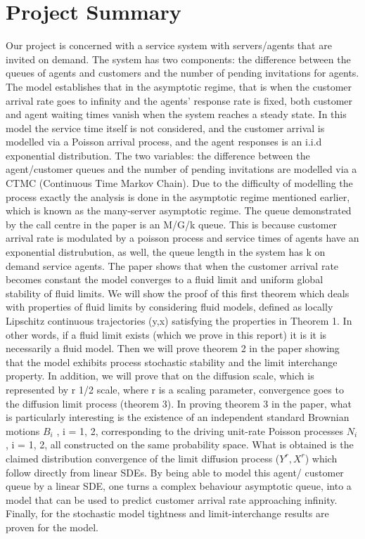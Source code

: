 	\section{Project Summary}
Our project is concerned with a service system with servers/agents that are invited on demand. The system has two components: the difference between the queues of agents and customers and the number of pending invitations for agents. The model establishes that in the asymptotic regime, that is when the customer arrival rate goes to infinity and the agents’ response rate is fixed, both customer and agent waiting times vanish when the system reaches a steady state. In this model the service time itself is not considered, and the customer arrival is modelled via a Poisson arrival process, and the agent responses is an i.i.d exponential distribution. The two variables: the difference between the agent/customer queues and the number of pending invitations are modelled via a CTMC (Continuous Time Markov Chain). Due to the difficulty of modelling the process exactly the analysis is done in the asymptotic regime mentioned earlier, which is known as the many-server asymptotic regime. The queue demonstrated by the call centre in the paper is an M/G/k queue. This is because customer arrival rate is modulated by a poisson process and service times of agents have an exponential distrubution, as well, the queue length in the system has k on demand service agents. \newline\newline
The paper shows that when the customer arrival rate becomes constant the model converges to a fluid limit and uniform global stability of fluid limits. We will show the proof of this first theorem which deals with properties of fluid limits by considering fluid models, defined as locally Lipschitz continuous trajectories (y,x) satisfying the properties in Theorem 1. In other words, if a fluid limit exists (which we prove in this report) it is it is necessarily a fluid model. Then we will prove theorem 2 in the paper showing that the model exhibits process stochastic stability and the limit interchange property. In addition, we will prove that on the diffusion scale, which is represented by r 1/2 scale, where r is a scaling parameter, convergence goes to the diffusion limit process (theorem 3). In proving theorem 3 in the paper, what is particularly interesting is the existence of an independent standard Brownian motions $B_i$ , i = 1, 2, corresponding to the driving unit-rate Poisson processes $N_i$ , i = 1, 2, all constructed on the same probability space. What is obtained is the claimed distribution convergence of the limit diffusion process ($Y^r , X^r$) which follow directly from linear SDEs. By being able to model this agent/ customer queue by  a linear SDE, one turns a complex behaviour asymptotic queue, into a model that can be used to predict customer arrival rate approaching infinity. Finally, for the stochastic model tightness and limit-interchange results are proven for the model. \newline\newline
